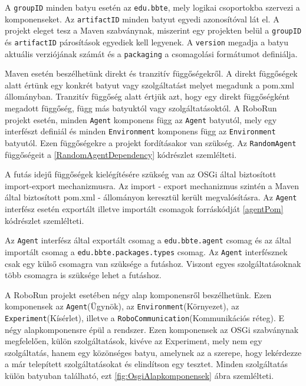 A \texttt{groupID} minden batyu esetén az \texttt{edu.bbte}, mely logikai csoportokba szervezi a komponenseket. Az \texttt{artifactID} minden batyut egyedi azonosítóval lát el. A projekt eleget tesz a Maven szabványnak, miszerint egy projekten belül a \texttt{groupID} és \texttt{artifactID} párosítások egyediek kell legyenek. A \texttt{version} megadja a batyu aktuális verziójának számát és a \texttt{packaging} a csomagolási formátumot definiálja.

Maven esetén beszélhetünk direkt és tranzitív függőségekről. A direkt függőségek alatt értünk egy konkrét batyut vagy szolgáltatást melyet megadunk a pom.xml állományban. Tranzitív függőség alatt értjük azt, hogy egy direkt függőségként megadott függőség, függ más batyuktól vagy szolgáltatásoktól. A RoboRun projekt esetén, minden \texttt{Agent} komponens függ az \texttt{Agent} batyutól, mely egy interfészt definiál és minden \texttt{Environment} komponens függ az \texttt{Environment} batyutól. Ezen függőségekre a projekt fordításakor van szükség. Az \texttt{RandomAgent} függőségeit a \ref{RandomAgentDependency} kódrészlet szemlélteti.

%


A futás idejű függőségek kielégítésére szükség van az OSGi által biztosított import-export mechanizmusra. Az import - export mechanizmus szintén a Maven által biztosított pom.xml - állományon keresztül került megvalósításra. Az \texttt{Agent} interfész esetén exportált illetve importált csomagok forráskódját \ref{agentPom} kódrészlet szemlélteti.




Az \texttt{Agent} interfész által exportált csomag a \texttt{edu.bbte.agent} csomag és az által importált csomag a \texttt{edu.bbte.packages.types} csomag. Az \texttt{Agent} interfésznek csak egy külső csomagra van szüksége a futáshoz. Viszont egyes szolgáltatásoknak több csomagra is szüksége lehet a futáshoz.

A RoboRun projekt esetében négy alap komponensről beszélhetünk. Ezen komponensek az \texttt{Agent}(Ügynök), az \texttt{Environment}(Környezet), az \texttt{Experiment}(Kísérlet), illetve a \texttt{RoboCommunication}(Kommunikációs réteg). E négy alapkomponensre épül a rendszer. Ezen komponensek az OSGi szabványnak megfelelően, külön szolgáltatások, kivéve az Experiment, mely nem egy szolgáltatás, hanem egy közönséges batyu, amelynek az a szerepe, hogy lekérdezze a már telepített szolgáltatásokat és elindítson egy tesztet. Minden szolgáltatás külön batyuban található, ezt \ref{fig:OsgiAlapkomponensek} ábra szemlélteti. 

